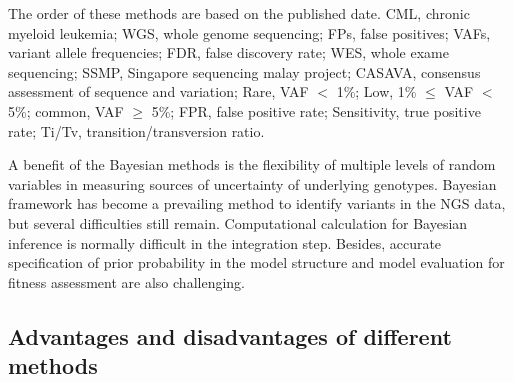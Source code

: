\documentclass[a4,center,fleqn]{NAR}
\begin{document}
\begin{landscape}
\begin{table}[htbp]
\begin{threeparttable}
\begin{tabular}{rlrr}
    \bottomrule
    \end{tabular}
   \begin{tablenotes}
	\item The order of these methods are based on the published date.
CML, chronic myeloid leukemia;
WGS, whole genome sequencing;
FPs, false positives;
VAFs, variant allele frequencies;
FDR, false discovery rate;
WES, whole exame sequencing;
SSMP, Singapore sequencing malay project;
CASAVA, consensus assessment of sequence and variation;
Rare, VAF $<$ 1\%; Low, 1\% $\leqslant$ VAF $<$  5\%; common, VAF $\geqslant$ 5\%;
FPR, false positive rate;
Sensitivity, true positive rate;
Ti/Tv, transition/transversion ratio.
    \end{tablenotes}
\end{threeparttable}
\end{table}
\end{landscape}





A benefit of the Bayesian methods is the flexibility of multiple levels of random variables in measuring sources of uncertainty of underlying genotypes.
Bayesian framework has become a prevailing method to identify variants in the NGS data, but several difficulties still remain.
Computational calculation for Bayesian inference is normally difficult in the integration step.
Besides, accurate specification of prior probability in the model structure and model evaluation for fitness assessment are also challenging.




\subsection{Advantages and disadvantages of different methods}
\end{document}
